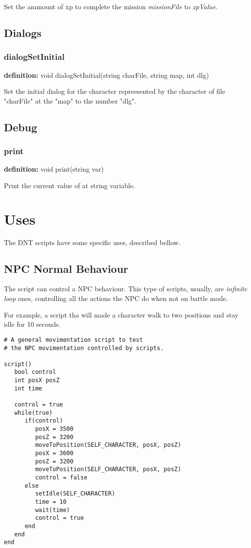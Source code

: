 \documentclass[ letterpaper,12pt]{article}
\begin{document}
Set the ammount of xp to complete the mission {\it missionFile} to {\it
xpValue}.

\subsection{Dialogs}

\subsubsection{dialogSetInitial}
{\bf definition:} void dialogSetInitial(string charFile, string map, int dlg)

Set the initial dialog for the character repreesented by the character of file
"charFile" at the "map" to the number "dlg".

\subsection{Debug}

\subsubsection{print}
{\bf definition:} void print(string var)

Print the current value of at string variable.

\section{Uses}

The DNT scripts have some specific uses, described bellow.

\subsection{NPC Normal Behaviour}

The script can control a NPC behaviour. This type of scripts, usually, are
{\it infinite loop} ones, controlling all the actions the NPC do when not on
battle mode.

For example, a script tha will made a character walk to two positions and stay
idle for 10 seconds.

\begin{verbatim}
# A general movimentation script to test
# the NPC movimentation controlled by scripts.

script()
   bool control
   int posX posZ
   int time

   control = true
   while(true)
      if(control)
         posX = 3500
         posZ = 3200
         moveToPosition(SELF_CHARACTER, posX, posZ)
         posX = 3600
         posZ = 3200
         moveToPosition(SELF_CHARACTER, posX, posZ)
         control = false
      else
         setIdle(SELF_CHARACTER)
         time = 10
         wait(time)
         control = true
      end
   end
end
\end{verbatim}
\end{document}

